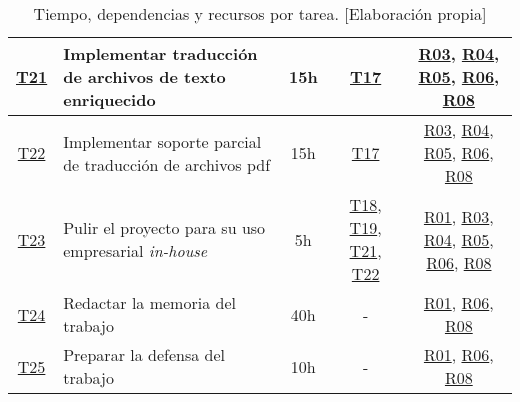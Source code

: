 \begin{landscape}
\begin{table}
\begin{tabular}{ | c | l | c | c | c | }
        \hline
        \hyperref[T21]{T21} & Implementar traducción de archivos de texto enriquecido & 15h & \hyperref[T17]{T17} & \hyperref[R03]{R03}, \hyperref[R04]{R04}, \hyperref[R05]{R05}, \hyperref[R06]{R06}, \hyperref[R08]{R08} \\
        \hline
        \hyperref[T22]{T22} & Implementar soporte parcial de traducción de archivos pdf & 15h & \hyperref[T17]{T17} & \hyperref[R03]{R03}, \hyperref[R04]{R04}, \hyperref[R05]{R05}, \hyperref[R06]{R06}, \hyperref[R08]{R08} \\
        \hline
        \hyperref[T23]{T23} & Pulir el proyecto para su uso empresarial \textit{in-house} & 5h & \hyperref[T18]{T18}, \hyperref[T19]{T19}, \hyperref[T20]{T21}, \hyperref[T22]{T22} & \hyperref[R01]{R01}, \hyperref[R03]{R03}, \hyperref[R04]{R04}, \hyperref[R05]{R05}, \hyperref[R06]{R06}, \hyperref[R08]{R08} \\
        \hline
        \hyperref[T24]{T24} & Redactar la memoria del trabajo & 40h & - & \hyperref[R01]{R01}, \hyperref[R06]{R06}, \hyperref[R08]{R08} \\
        \hline
        \hyperref[T25]{T25} & Preparar la defensa del trabajo & 10h & - & \hyperref[R01]{R01}, \hyperref[R06]{R06}, \hyperref[R08]{R08} \\
        \hline
    \end{tabular}
    \caption{Tiempo, dependencias y recursos por tarea. [Elaboración propia]}
    \end{table}
\end{landscape}
\restoregeometry